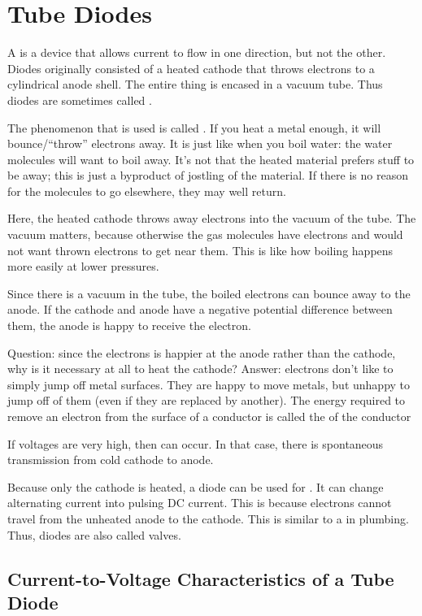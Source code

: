 \documentclass[11pt, oneside]{amsart}
\begin{document}
\section{Tube Diodes}

A  is a device that allows current to flow in one
direction, but not the other. Diodes originally consisted of a heated
cathode that throws electrons to a cylindrical anode shell. The entire
thing is encased in a vacuum tube. Thus diodes are sometimes called
.

The phenomenon that is used is called . If
you heat a metal enough, it will bounce/``throw'' electrons away. It is
just like when you boil water: the water molecules will want to boil
away. It's not that the heated material prefers stuff to be away; this
is just a byproduct of jostling of the material. If there is no reason
for the molecules to go elsewhere, they may well return.

Here, the heated cathode throws away electrons into the vacuum of the
tube. The vacuum matters, because otherwise the gas molecules have
electrons and would not want thrown electrons to get near them. This is
like how boiling happens more easily at lower pressures.

Since there is a vacuum in the tube, the boiled electrons can bounce
away to the anode. If the cathode and anode have a negative potential
difference between them, the anode is happy to receive the electron.

Question: since the electrons is happier at the anode rather than the
cathode, why is it necessary at all to heat the cathode? Answer:
electrons don't like to simply jump off metal surfaces. They are happy
to move  metals, but unhappy to jump off of them (even
if they are replaced by another). The energy required to remove an
electron from the surface of a conductor is called the  of the conductor

If voltages are very high, then  can
occur. In that case, there is spontaneous transmission from cold cathode
to anode.

Because only the cathode is heated, a diode can be used for
. It can change alternating current into pulsing
DC current. This is because electrons cannot travel from the unheated
anode to the cathode. This is similar to a  in plumbing.
Thus, diodes are also called valves.

\subsection{Current-to-Voltage Characteristics of a Tube Diode}
\end{document}
